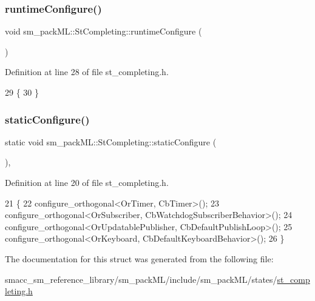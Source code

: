 \subsubsection{\texorpdfstring{runtime\+Configure()}{runtimeConfigure()}}
{\footnotesize\ttfamily void sm\+\_\+pack\+M\+L\+::\+St\+Completing\+::runtime\+Configure (\begin{DoxyParamCaption}{ }\end{DoxyParamCaption})\hspace{0.3cm}{\ttfamily [inline]}}



Definition at line 28 of file st\+\_\+completing.\+h.


\begin{DoxyCode}
29     \{
30     \}
\end{DoxyCode}
\mbox{\label{structsm__packML_1_1StCompleting_a67bbe8665dd9e951fb6c3c537a984d9b}} 
\subsubsection{\texorpdfstring{static\+Configure()}{staticConfigure()}}
{\footnotesize\ttfamily static void sm\+\_\+pack\+M\+L\+::\+St\+Completing\+::static\+Configure (\begin{DoxyParamCaption}{ }\end{DoxyParamCaption})\hspace{0.3cm}{\ttfamily [inline]}, {\ttfamily [static]}}



Definition at line 20 of file st\+\_\+completing.\+h.


\begin{DoxyCode}
21     \{
22         configure\_orthogonal<OrTimer, CbTimer>();   
23         configure\_orthogonal<OrSubscriber, CbWatchdogSubscriberBehavior>();
24         configure\_orthogonal<OrUpdatablePublisher, CbDefaultPublishLoop>();
25         configure\_orthogonal<OrKeyboard, CbDefaultKeyboardBehavior>();
26     \}
\end{DoxyCode}


The documentation for this struct was generated from the following file\+:\begin{DoxyCompactItemize}
\item 
smacc\+\_\+sm\+\_\+reference\+\_\+library/sm\+\_\+pack\+M\+L/include/sm\+\_\+pack\+M\+L/states/\hyperlink{st__completing_8h}{st\+\_\+completing.\+h}\end{DoxyCompactItemize}
